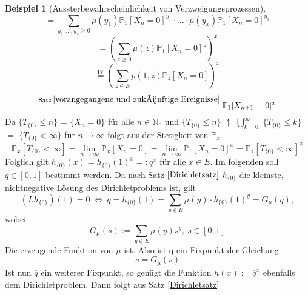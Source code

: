 \documentclass[a4paper,12pt]{scrartcl}
\theoremstyle{definition}
\newtheorem{bsp}{Beispiel}[section]
\begin{document}
\begin{bsp}[Aussterbewahrscheinlichkeit von Verzweigungsprozessen]
\begin{equation*}
= \sum_{y_{1},...,y_{x} \geq 0 } \mu(y_{1}) \mathbb{P}_{1}[X_{n} = 0]^{y_{1}} \cdot...\cdot \mu(y_{x}) \mathbb{P}_{1}[X_{n} = 0]^{y_{x}}
\end{equation*}
\begin{equation*}
= (\sum_{z \geq 0} \mu(z) \mathbb{P}_{1}[X_{n} = 0]^{z})^{x}
\end{equation*}
\begin{equation*}
\stackrel{\mathrm{IV}}{=} (\sum_{z \in E} p(1,z) \mathbb{P}_{z}[X_{n} = 0])^{x}
\end{equation*}
\begin{equation*}
\stackrel{\mathrm{Satz} \: \ref{vorangegangene und zukünftige Ereignisse}}{=}   \mathbb{P}_{1}[X_{n+1} = 0]^{x}
\end{equation*}
Da $\lbrace T_{\lbrace 0 \rbrace} \leq n \rbrace$ = $\lbrace X_{n} = 0 \rbrace$ für alle $n \in \mathbb{N}_{0}$ und $\lbrace T_{\lbrace 0 \rbrace}  \leq n \rbrace$ $\uparrow$ $\bigcup_{k=0}^{\infty}$ $\lbrace T_{\lbrace 0 \rbrace} \leq k \rbrace$ $=$ $\lbrace T_{\lbrace 0 \rbrace} < \infty \rbrace$ für $n \to \infty$ folgt aus der Stetigkeit von $\mathbb{P}_{x}$
\begin{equation*}
\mathbb{P}_{x}[T_{\lbrace 0 \rbrace} < \infty] = \lim_{n \to \infty} \mathbb{P}_{x}[X_{n} = 0] = \lim_{n \to \infty} \mathbb{P}_{1}[X_{n} = 0]^{x} = \mathbb{P}_{1}[T_{\lbrace 0 \rbrace} < \infty]^{x}
\end{equation*}
Folglich gilt $h_{\lbrace 0 \rbrace}(x) = h_{\lbrace 0 \rbrace}(1)^{x} =: q^{x}$ für alle $x \in E$. Im folgenden soll $q \in [0,1]$ bestimmt werden. Da nach Satz $\ref{Dirichletsatz}$ $h_{\lbrace 0 \rbrace}$ die kleinste, nichtnegative Lösung des Dirichletproblems ist, gilt
\begin{equation*}
(Lh_{\lbrace 0 \rbrace})(1) = 0 \: \Leftrightarrow \: q = h_{\lbrace 0 \rbrace}(1) = \sum_{y \in E} \mu(y) \cdot  h_{\lbrace 0 \rbrace}(1)^{y} = G_{\mu}(q),
\end{equation*} 
wobei
\begin{equation*}
G_{\mu}(s) := \sum_{y \in E} \mu(y) s^{y}, \: s \in [0,1]
\end{equation*}
Die erzeugende Funktion von $\mu$ ist. Also ist q ein Fixpunkt der Gleichung
\begin{equation*}
s = G_{\mu}(s)
\end{equation*}
Ist nun $\overline{q}$ ein weiterer Fixpunkt, so genügt die Funktion $h(x) := \overline{q}^{x}$ ebenfalls dem Dirichletproblem. Dann folgt aus Satz \ref{Dirichletsatz}

\end{bsp}
\end{document}

